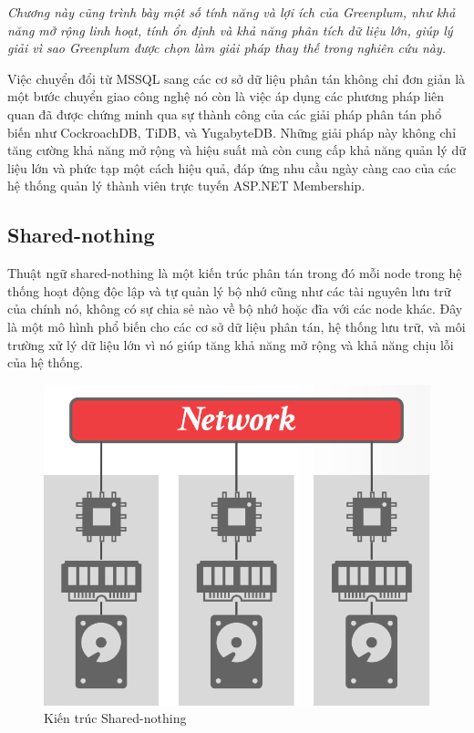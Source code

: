 \documentclass{extreport}[13.5pt, oneside,a4paper]
\begin{document}
\textit{Chương này cũng trình bày một số tính năng và lợi ích của Greenplum, như khả năng mở rộng linh hoạt, tính ổn định và khả năng phân tích dữ liệu lớn, giúp lý giải vì sao Greenplum được chọn làm giải pháp thay thế trong nghiên cứu này.}

Việc chuyển đổi từ MSSQL sang các cơ sở dữ liệu phân tán không chỉ đơn giản là một bước chuyển giao công nghệ nó còn là việc áp dụng các phương pháp liên quan đã được chứng minh qua sự thành công của các giải pháp phân tán phổ biến như CockroachDB, TiDB, và YugabyteDB. Những giải pháp này không chỉ tăng cường khả năng mở rộng và hiệu suất mà còn cung cấp khả năng quản lý dữ liệu lớn và phức tạp một cách hiệu quả, đáp ứng nhu cầu ngày càng cao của các hệ thống quản lý thành viên trực tuyến ASP.NET Membership.

\subsection{Shared-nothing}

Thuật ngữ shared-nothing \cite{article} là một kiến trúc phân tán trong đó mỗi node trong hệ thống hoạt động độc lập và tự quản lý bộ nhớ cũng như các tài nguyên lưu trữ của chính nó, không có sự chia sẻ nào về bộ nhớ hoặc đĩa với các node khác. Đây là một mô hình phổ biến cho các cơ sở dữ liệu phân tán, hệ thống lưu trữ, và môi trường xử lý dữ liệu lớn vì nó giúp tăng khả năng mở rộng và khả năng chịu lỗi của hệ thống.

\begin{figure}
    \centering
    \includegraphics[width=1\linewidth]{ShareNothingAr.png}
    \caption{Kiến trúc Shared-nothing}
    \label{fig:ShareNothingAr}
\end{figure}
\end{document}
